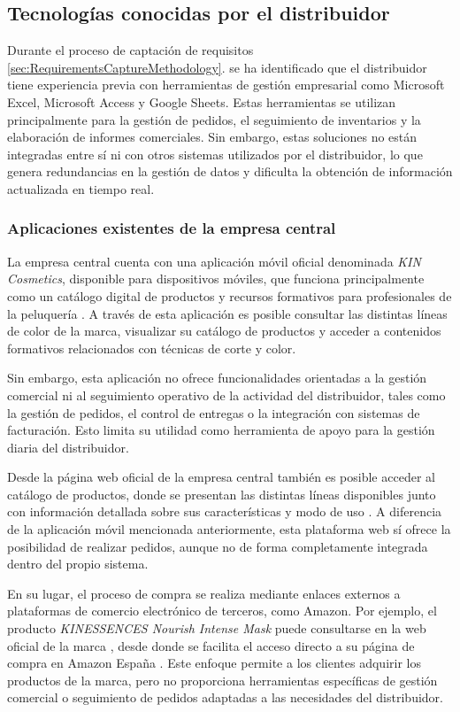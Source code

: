 \subsection{Tecnologías conocidas por el distribuidor}

Durante el proceso de captación de requisitos \ref{sec:RequirementsCaptureMethodology}. se ha identificado que el distribuidor tiene experiencia previa con herramientas de gestión empresarial como Microsoft Excel, Microsoft Access y Google Sheets. Estas herramientas se utilizan principalmente para la gestión de pedidos, el seguimiento de inventarios y la elaboración de informes comerciales. Sin embargo, estas soluciones no están integradas entre sí ni con otros sistemas utilizados por el distribuidor, lo que genera redundancias en la gestión de datos y dificulta la obtención de información actualizada en tiempo real.

\subsubsection{Aplicaciones existentes de la empresa central}

La empresa central cuenta con una aplicación móvil oficial denominada \textit{KIN Cosmetics}, disponible para dispositivos móviles, que funciona principalmente como un catálogo digital de productos y recursos formativos para profesionales de la peluquería \cite{kintrends}. A través de esta aplicación es posible consultar las distintas líneas de color de la marca, visualizar su catálogo de productos y acceder a contenidos formativos relacionados con técnicas de corte y color.

Sin embargo, esta aplicación no ofrece funcionalidades orientadas a la gestión comercial ni al seguimiento operativo de la actividad del distribuidor, tales como la gestión de pedidos, el control de entregas o la integración con sistemas de facturación. Esto limita su utilidad como herramienta de apoyo para la gestión diaria del distribuidor.

Desde la página web oficial de la empresa central también es posible acceder al catálogo de productos, donde se presentan las distintas líneas disponibles junto con información detallada sobre sus características y modo de uso \cite{kincosmetics_web}. A diferencia de la aplicación móvil mencionada anteriormente, esta plataforma web sí ofrece la posibilidad de realizar pedidos, aunque no de forma completamente integrada dentro del propio sistema.

En su lugar, el proceso de compra se realiza mediante enlaces externos a plataformas de comercio electrónico de terceros, como Amazon. Por ejemplo, el producto \textit{KINESSENCES Nourish Intense Mask} puede consultarse en la web oficial de la marca \cite{kincosmetics_producto}, desde donde se facilita el acceso directo a su página de compra en Amazon España \cite{amazon_producto}. Este enfoque permite a los clientes adquirir los productos de la marca, pero no proporciona herramientas específicas de gestión comercial o seguimiento de pedidos adaptadas a las necesidades del distribuidor.

